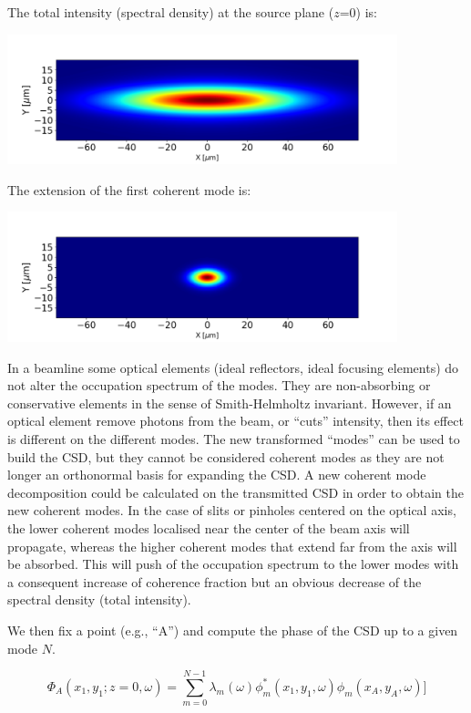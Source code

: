 \documentclass[a4paper,10pt]{article}
\begin{document}
The total intensity (spectral density) at the source plane ($z$=0) is: 

\includegraphics[width=0.85\textwidth]{Figures/spectral_density_upto1099.png}

The extension of the first coherent mode is:

\includegraphics[width=0.85\textwidth]{Figures/spectral_density_upto0.png}

In a beamline some optical elements (ideal reflectors, ideal focusing elements) do not alter the occupation spectrum of the modes. They are non-absorbing or conservative elements in the sense of Smith-Helmholtz invariant. However, if an optical element remove photons from the beam, or ``cuts'' intensity, then its effect is different on the different modes. The new transformed ``modes'' can be used to build the CSD, but they cannot be considered coherent modes as they are not longer an orthonormal basis for expanding the CSD. A new coherent mode decomposition could be calculated on the transmitted CSD in order to obtain the new coherent modes. In the case of slits or pinholes centered on the optical axis, the lower coherent modes localised near the center of the beam axis will propagate, whereas the higher coherent modes that extend far from the axis will be absorbed. This will push of the occupation spectrum to the lower modes with a consequent increase of coherence fraction but an obvious decrease of the spectral density (total intensity).  



We then fix a point (e.g., ``A'') and compute the phase of the CSD up to a given mode $N$. 

\begin{equation}\label{phase_of_W}
\Phi_A(x_1,y_1;z=0,\omega)= %
\sum_{m=0}^{N-1} \lambda_m(\omega)
\phi_m^*(x_1,y_1,\omega)
\phi_m(x_A,y_A, \omega)]
\end{equation}
\end{document}
